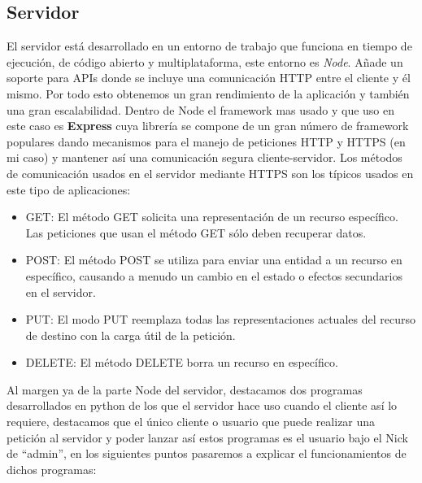 \documentclass[a4paper, 12pt]{book}
\begin{document}
\subsection{Servidor}

	El servidor está desarrollado en un entorno de trabajo que funciona en tiempo de ejecución, de código abierto y multiplataforma, este entorno es \textit{Node}. Añade un soporte para APIs donde se incluye una comunicación HTTP entre el cliente y él mismo. Por todo esto obtenemos un gran rendimiento de la aplicación y también una gran escalabilidad. Dentro de Node el framework mas usado y que uso en este caso es \textbf{Express} cuya librería se compone de un gran número de framework populares dando mecanismos para el manejo de peticiones HTTP y HTTPS (en mi caso) y mantener así una comunicación segura cliente-servidor. 
	Los métodos de comunicación usados en el servidor mediante HTTPS son los típicos usados en este tipo de aplicaciones:
	\begin{itemize}
  	\item GET: El método GET  solicita una representación de un recurso específico. Las peticiones que usan el método GET sólo deben recuperar datos.
  	\item POST: El método POST se utiliza para enviar una entidad a un recurso en específico, causando a menudo un cambio en el estado o efectos secundarios en el servidor.
  	\item PUT: El modo PUT reemplaza todas las representaciones actuales del recurso de destino con la carga útil de la petición.
  	\item DELETE: El método DELETE borra un recurso en específico.
	\end{itemize}

Al margen ya de la parte Node del servidor, destacamos dos programas desarrollados en python de los que el servidor hace uso cuando el cliente así lo requiere, destacamos que el único cliente o usuario que puede realizar una petición al servidor y poder lanzar así estos programas es el usuario bajo el Nick de ``admin'', en los siguientes puntos pasaremos a explicar el funcionamientos de dichos programas:
\end{document}
